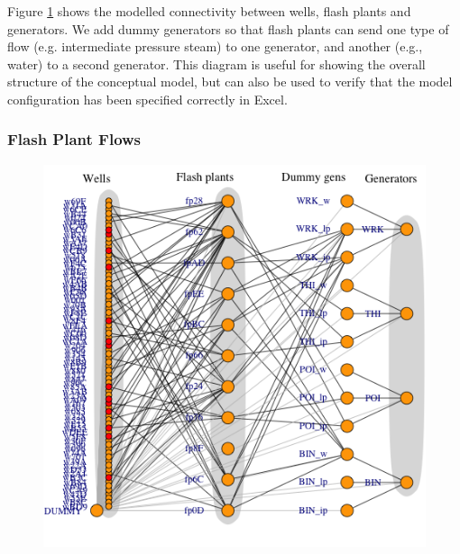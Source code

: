 \documentclass[a4paper, 12pt]{article}
\begin{document}
Figure \ref{fig:full_network} shows the modelled connectivity between wells, flash plants and generators. We add dummy generators so that flash plants can send one type of flow (e.g. intermediate pressure steam) to one generator, and another (e.g., water) to a second generator. This diagram is useful for showing the overall structure of the conceptual model, but can also be used to verify that the model configuration has been specified correctly in Excel.

\subsubsection{Flash Plant Flows}

\begin{figure}
\centering
\begin{minipage}[t]{.48\textwidth}
  \centering
  \includegraphics[width=\linewidth]{media/full_network}
  \label{fig:full_network}
\end{minipage}\hfill
\begin{minipage}[t]{.48\textwidth}
  \centering

\end{minipage}
\end{figure}
\end{document}
